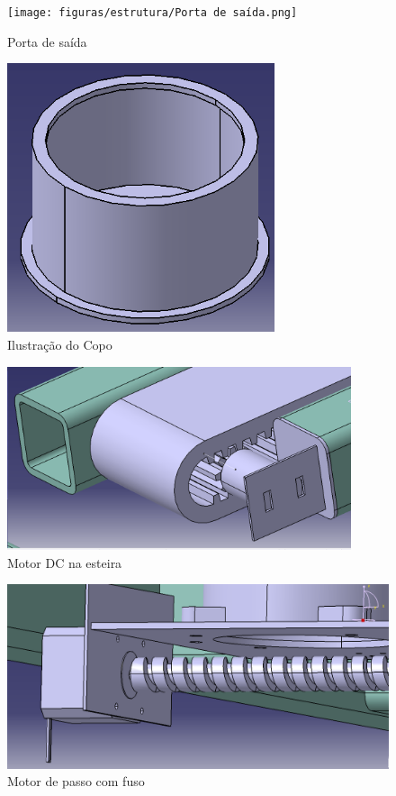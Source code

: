 \begin{apendicesenv}
\begin{figure}[H]
    \centering
    \texttt{[image: figuras/estrutura/Porta de saída.png]}
    \caption{Porta de saída}
    \label{fig:portas}
\end{figure}

\begin{figure}[H]
    \centering
    \includegraphics[width=0.7\textwidth]{figuras/estrutura/Copo.png}
    \caption{Ilustração do Copo}
    \label{fig:copos}
\end{figure}

\begin{figure}[H]
    \centering
    \includegraphics[width=0.9\textwidth]{figuras/estrutura/Motor DC na Esteira.png}
    \caption{Motor DC na esteira}
    \label{fig:DCnaesteira}
\end{figure}

\begin{figure}[H]
    \centering
    \includegraphics[width=1\textwidth]{figuras/estrutura/Motor de Passo no Fuso.png}
    \caption{Motor de passo com fuso}
    \label{fig:motordepassonofuso}
\end{figure}


\end{apendicesenv}
